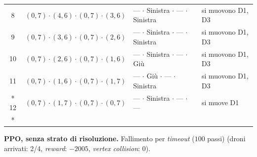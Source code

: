 \documentclass[12pt,a4paper,twoside]{report}
\begin{document}
{\begin{longtable}{c l l >{\raggedright\arraybackslash}p{3.8cm}}
8  & $(0, 7) \cdot (4, 6) \cdot (0, 7) \cdot (3, 6)$ & --- $\cdot$ Sinistra $\cdot$ --- $\cdot$ Sinistra & si muovono D1, D3 \\
9  & $(0, 7) \cdot (3, 6) \cdot (0, 7) \cdot (2, 6)$ & --- $\cdot$ Sinistra $\cdot$ --- $\cdot$ Sinistra & si muovono D1, D3 \\
10 & $(0, 7) \cdot (2, 6) \cdot (0, 7) \cdot (1, 6)$ & --- $\cdot$ Sinistra $\cdot$ --- $\cdot$ Giù    & si muovono D1, D3 \\
11 & $(0, 7) \cdot (1, 6) \cdot (0, 7) \cdot (1, 7)$ & --- $\cdot$ Giù $\cdot$ --- $\cdot$ Sinistra    & si muovono D1, D3 \\*
12 & $(0, 7) \cdot (1, 7) \cdot (0, 7) \cdot (0, 7)$ & --- $\cdot$ Sinistra $\cdot$ --- $\cdot$ ---    & si muove D1 \\*
\end{longtable}
}
\newpage
\noindent\textbf{PPO, senza strato di risoluzione.} Fallimento per \emph{timeout} ($100$ passi) (droni arrivati: 2/4, \emph{reward}: $-2005$, \emph{vertex collision}: $0$).
\end{document}
